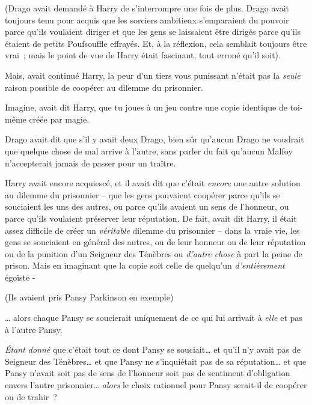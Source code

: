 (Drago avait demandé à Harry de s'interrompre une fois de plus. Drago avait toujours tenu pour acquis que les sorciers ambitieux s'emparaient du pouvoir parce qu'ils voulaient diriger et que les gens se laissaient être dirigés parce qu'ils étaient de petits Poufsouffle effrayés. Et, à la réflexion, cela semblait toujours être vrai~; mais le point de vue de Harry était fascinant, tout erroné qu'il soit).

Mais, avait continué Harry, la peur d'un tiers vous punissant n'était pas la \emph{seule} raison possible de coopérer au dilemme du prisonnier.

Imagine, avait dit Harry, que tu joues à un jeu contre une copie identique de toi-même créée par magie.

Drago avait dit que s'il y avait deux Drago, bien sûr qu'aucun Drago ne voudrait que quelque chose de mal arrive à l'autre, sans parler du fait qu'aucun Malfoy n'accepterait jamais de passer pour un traître.

Harry avait encore acquiescé, et il avait dit que c'était \emph{encore} une autre solution au dilemme du prisonnier -- que les gens pouvaient coopérer parce qu'ils se souciaient les uns des autres, ou parce qu'ils avaient un sens de l'honneur, ou parce qu'ils voulaient préserver leur réputation. De fait, avait dit Harry, il était assez difficile de créer un \emph{véritable} dilemme du prisonnier -- dans la vraie vie, les gens se souciaient en général des autres, ou de leur honneur ou de leur réputation ou de la punition d'un Seigneur des Ténèbres ou \emph{d'autre chose} à part la peine de prison. Mais en imaginant que la copie soit celle de quelqu'un \emph{d'entièrement} égoïste -

(Ils avaient pris Pansy Parkinson en exemple)

… alors chaque Pansy se soucierait uniquement de ce qui lui arrivait à \emph{elle} et pas à l'autre Pansy.

\emph{Étant donné} que c'était tout ce dont Pansy se souciait… et qu'il n'y avait pas de Seigneur des Ténèbres… et que Pansy ne s'inquiétait pas de sa réputation… et que Pansy n'avait soit pas de sens de l'honneur soit pas de sentiment d'obligation envers l'autre prisonnier… \emph{alors} le choix rationnel pour Pansy serait-il de coopérer ou de trahir~?

